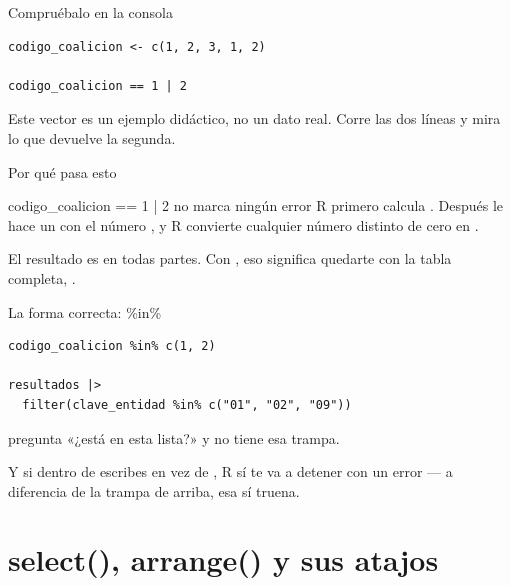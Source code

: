 \begin{frame}[fragile]{Compruébalo en la consola}
\begin{lstlisting}
codigo_coalicion <- c(1, 2, 3, 1, 2)

codigo_coalicion == 1 | 2
\end{lstlisting}

  \vspace{0.6em}
  {\small\color{grisTenue}Este vector es un ejemplo didáctico, no un dato
  real. Corre las dos líneas y mira lo que devuelve la segunda.}
\end{frame}

\begin{frame}{Por qué pasa esto}
  \vspace{0.4em}
  \begin{errorbox}{codigo\_coalicion == 1 | 2 no marca ningún error}
    R primero calcula . Después le hace un
     con el número , y R convierte cualquier número distinto
    de cero en .

    \vspace{0.5em}
    El resultado es  en todas partes. Con , eso
    significa quedarte con la tabla completa, .
  \end{errorbox}
\end{frame}

\begin{frame}[fragile]{La forma correcta: \%in\%}
\begin{lstlisting}
codigo_coalicion %in% c(1, 2)

resultados |>
  filter(clave_entidad %in% c("01", "02", "09"))
\end{lstlisting}

  \vspace{0.6em}
   pregunta «¿está en esta lista?» y no tiene esa trampa.

  \vspace{0.5em}
  {\small\color{grisTenue}Y si dentro de  escribes \cod{=} en
  vez de \cod{==}, R sí te va a detener con un error — a diferencia de la
  trampa de arriba, esa sí truena.}
\end{frame}

\section{select(), arrange() y sus atajos}

